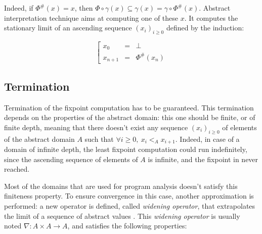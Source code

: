 \documentclass[a4paper,english,titlepage,11pt]{report}
\newtheorem{proposition}[theorem]{Proposition}
\def\lfp{\textnormal{\it lfp}}
\begin{document}
Indeed, if $\Phi^\#(x) = x$, then $\Phi \circ \gamma (x) \subseteq \gamma(x)
= \gamma \circ \Phi^\#(x)$. Abstract interpretation technique aims at computing
one of these $x$. It computes the stationary limit of an ascending sequence
$(x_i)_{i \geq 0}$ defined by the induction:

$$\left[
\begin{array}{lll}
x_0 &=& \perp \\
x_{n+1} &=& \Phi^\#(x_n)
\end{array}
\right.
$$
%
%
%
%


\subsection{Termination}

Termination of the fixpoint computation has to be guaranteed. This termination
depends on the properties of the abstract domain:
this one should be finite, or of finite depth, meaning that there doesn't exist
any sequence $(x_i)_{i \geq 0}$ of elements of the abstract domain $A$ such that
$\forall i \geq 0,\ x_i <_A x_{i+1}$. Indeed, in case of a domain of infinite
depth, the least fixpoint
computation could run indefinitely, since the ascending sequence of elements of
$A$ is infinite, and the fixpoint in never reached.


Most of the domains that are used for program analysis doesn't satisfy this
finiteness property. To ensure convergence in this case, another approximation
is performed: a new operator is defined, called \emph{widening operator}, that
extrapolates the limit of a sequence of abstract values
\cite{CC77,CousotCousot92-4}. This \emph{widening
operator} is usually noted $\nabla: A \times A \rightarrow A$, and satisfies
the following properties:
\end{document}
